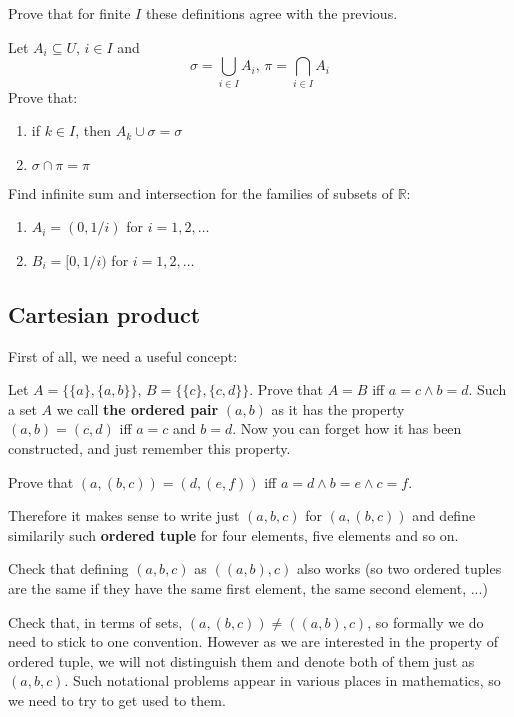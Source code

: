 \begin{prob}
	Prove that for finite $I$ these definitions agree with the previous.
\end{prob}

\begin{prob} Let $A_i\subseteq U,\, i\in I$ and 
	$$\sigma = \bigcup_{i\in I}A_i,\, \pi = \bigcap_{i\in I}A_i$$
	Prove that:
	\begin{enumerate}
		\item if $k\in I$, then $A_k\cup \sigma=\sigma$
		\item $\sigma\cap \pi = \pi$
	\end{enumerate}
\end{prob}

\begin{prob} Find infinite sum and intersection for the families of subsets of $\mathbb{R}$:
	\begin{enumerate}
		\item $A_i=(0,1/i)$ for $i=1,2,\dots$
		\item $B_i=[0,1/i)$ for $i=1,2,\dots$
	\end{enumerate}
\end{prob}

\subsection{Cartesian product}
First of all, we need a useful concept:
\begin{prob}
	Let $A=\{\{a\}, \{a,b\}\},\, B=\{\{c\},\{c,d\}\}$. Prove that $A=B$ iff $a=c\wedge b=d$. Such a set $A$ we call
	\textbf{the ordered pair} $(a,b)$ as it has the property $(a,b)=(c,d)$ iff $a=c$ and $b=d$. 
	Now you can forget how it has been constructed, and just remember this property.
\end{prob}

\begin{prob}
Prove that $(a,(b,c))=(d,(e,f))$ iff $a=d\wedge b=e\wedge c=f$.
\end{prob}
\noindent Therefore it makes sense to write just
$(a,b,c)$ for $(a,(b,c))$ and define similarily such \textbf{ordered tuple} for four elements, five elements
and so on.
\begin{prob}
Check that defining $(a,b,c)$ as $((a,b),c)$ also works (so two ordered tuples are the same if they have the
same first element, the same second element, ...)
\end{prob}
\begin{prob}
Check that, in terms of sets, $(a,(b,c))\neq ((a,b),c)$, so formally we do need to stick to one convention. 
However as we are interested in the property of ordered tuple, we will not distinguish them and denote both
of them just as $(a,b,c)$. Such notational problems appear in various places in mathematics, so we need to
try to get used to them.
\end{prob}

